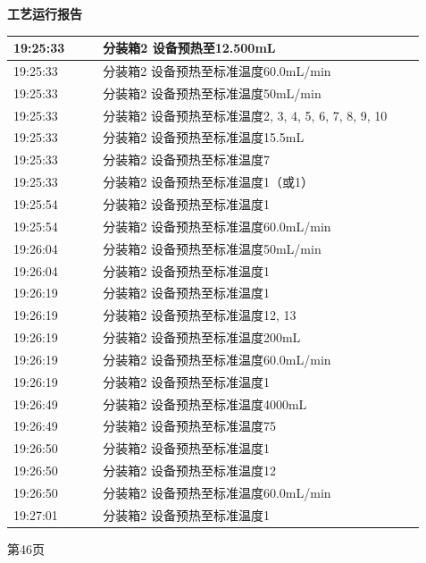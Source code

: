 \documentclass[UTF8,10pt,a4paper,fontset=fandol]{ctexart}
\begin{document}
\hfill
\begin{minipage}[t]{0.48\linewidth}
\centering
\textbf{工艺运行报告}

\vspace{2mm}
\scriptsize
\begin{tabular}{|p{0.20\linewidth}|p{0.72\linewidth}|}
\hline
19:25:33 & 分装箱2 设备预热至12.500mL \\ \hline
19:25:33 & 分装箱2 设备预热至标准温度60.0mL/min \\ \hline
19:25:33 & 分装箱2 设备预热至标准温度50mL/min \\ \hline
19:25:33 & 分装箱2 设备预热至标准温度2, 3, 4, 5, 6, 7, 8, 9, 10 \\ \hline
19:25:33 & 分装箱2 设备预热至标准温度15.5mL \\ \hline
19:25:33 & 分装箱2 设备预热至标准温度7 \\ \hline
19:25:33 & 分装箱2 设备预热至标准温度1（或1） \\ \hline
19:25:54 & 分装箱2 设备预热至标准温度1 \\ \hline
19:25:54 & 分装箱2 设备预热至标准温度60.0mL/min \\ \hline
19:26:04 & 分装箱2 设备预热至标准温度50mL/min \\ \hline
19:26:04 & 分装箱2 设备预热至标准温度1 \\ \hline
19:26:19 & 分装箱2 设备预热至标准温度1 \\ \hline
19:26:19 & 分装箱2 设备预热至标准温度12, 13 \\ \hline
19:26:19 & 分装箱2 设备预热至标准温度200mL \\ \hline
19:26:19 & 分装箱2 设备预热至标准温度60.0mL/min \\ \hline
19:26:19 & 分装箱2 设备预热至标准温度1 \\ \hline
19:26:49 & 分装箱2 设备预热至标准温度4000mL \\ \hline
19:26:49 & 分装箱2 设备预热至标准温度75 \\ \hline
19:26:50 & 分装箱2 设备预热至标准温度1 \\ \hline
19:26:50 & 分装箱2 设备预热至标准温度12 \\ \hline
19:26:50 & 分装箱2 设备预热至标准温度60.0mL/min \\ \hline
19:27:01 & 分装箱2 设备预热至标准温度1 \\ \hline
\end{tabular}

\vspace{2mm}
第46页
\end{minipage}
\end{document}
